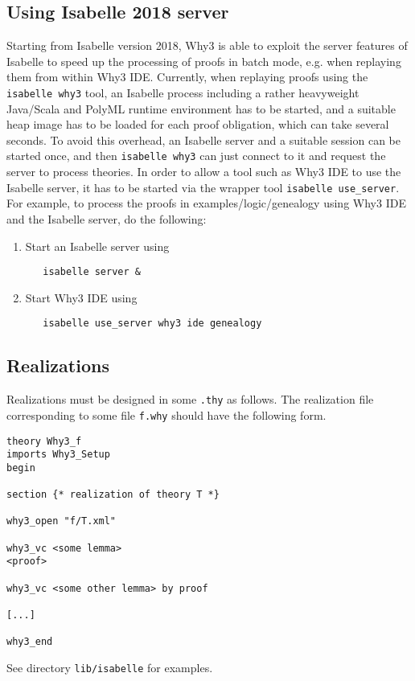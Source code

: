 \subsection{Using Isabelle 2018 server}

Starting from Isabelle version 2018, Why3 is able to exploit the
server features of Isabelle to speed up the processing of proofs in
batch mode, e.g. when replaying them from within Why3 IDE. Currently,
when replaying proofs using the \verb|isabelle why3| tool, an Isabelle
process including a rather heavyweight Java/Scala and PolyML runtime
environment has to be started, and a suitable heap image has to be
loaded for each proof obligation, which can take several seconds. To
avoid this overhead, an Isabelle server and a suitable session can be
started once, and then \verb|isabelle why3| can just connect to it and
request the server to process theories. In order to allow a tool such
as Why3 IDE to use the Isabelle server, it has to be started via the
wrapper tool \verb|isabelle use_server|. For example, to process the proofs
in examples/logic/genealogy using Why3 IDE and the Isabelle server, do
the following:
\begin{enumerate}
\item Start an Isabelle server using
\begin{verbatim}
   isabelle server &
\end{verbatim}
\item Start Why3 IDE using
\begin{verbatim}
   isabelle use_server why3 ide genealogy
\end{verbatim}
\end{enumerate}

 \subsection{Realizations}

Realizations must be designed in some \texttt{.thy} as follows.
The realization file corresponding to some \why file \texttt{f.why}
should have the following form.
\begin{verbatim}
theory Why3_f
imports Why3_Setup
begin

section {* realization of theory T *}

why3_open "f/T.xml"

why3_vc <some lemma>
<proof>

why3_vc <some other lemma> by proof

[...]

why3_end
\end{verbatim}

See directory \texttt{lib/isabelle} for examples.


